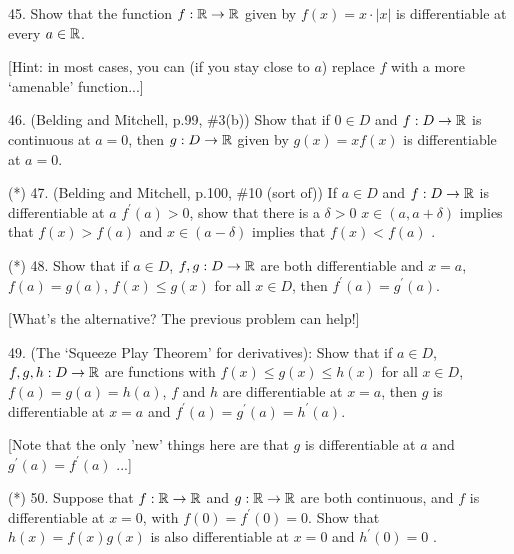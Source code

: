\documentclass[12pt]{article}
\begin{document}
\begin{description}


\item{45.} Show that the function $f:{\mathbb R}\rightarrow{\mathbb R}$ given by $f(x)=x\cdot |x|$ is 
differentiable at every $a\in{\mathbb R}$. 

\ssk

\item{\spc} [Hint: in most cases, you can (if you stay close to $a$) replace $f$ with a more 
`amenable' function...]

\msk

\item{46.} (Belding and Mitchell, p.99, \#3(b)) Show that if $0\in D$ and  $f:D\rightarrow{\mathbb R}$ is continuous at
$a=0$, then $g:D\rightarrow{\mathbb R}$ given by $g(x)=xf(x)$ is differentiable at $a=0$.

\msk

\item{(*) 47.} (Belding and Mitchell, p.100, \#10 (sort of)) If $a\in D$ and $f:D\rightarrow{\mathbb R}$ is differentiable
at $a$  $f^{\prime}(a)>0$, show that there is a $\delta>0$ 
$x\in (a,a+\delta)$ implies that $f(x)>f(a)$ and $x\in (a-\delta)$ implies that $f(x)<f(a)$ .

\msk

\item{(*) 48.} Show that if $a\in D$, $f,g:D\rightarrow{\mathbb R}$ are both differentiable and $x=a$, 
$f(a)=g(a)$,  $f(x)\leq g(x)$ for all $x\in D$, then $f^{\prime}(a)=g^{\prime}(a)$.

\ssk

\item{\spc} [What's the alternative? The previous problem can help!]
 
\msk

\item{49.} (The `Squeeze Play Theorem' for derivatives):
Show that if $a\in D$, $f,g,h:D\rightarrow{\mathbb R}$ are functions with
$f(x)\leq g(x)\leq h(x)$ for all $x\in D$, $f(a)=g(a)=h(a)$,  $f$ and $h$ are differentiable at $x=a$, 
then $g$ is differentiable at $x=a$ and $f^{\prime}(a)=g^{\prime}(a)=h^\prime(a)$.

\ssk

\item{\spc} [Note that the only 'new' things here are that $g$ is differentiable at $a$ and $g^\prime(a)=f^\prime(a)$ ...]

\msk

\item{(*) 50.} Suppose that $f:{\mathbb R}\rightarrow{\mathbb R}$ and $g:{\mathbb R}\rightarrow{\mathbb R}$
are both continuous, and $f$ is differentiable at $x=0$, with
$f(0)=f^\prime(0)=0$. Show that $h(x)=f(x)g(x)$ is also 
differentiable at $x=0$ and $h^\prime(0)=0$ .


\end{description}
\end{document}
